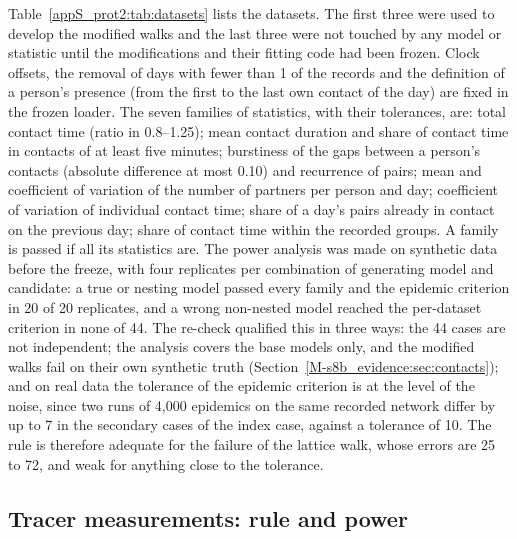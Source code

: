 Table~\ref{appS_prot2:tab:datasets} lists the datasets. The first three were used to develop the modified
walks and the last three were not touched by any model or statistic until the modifications and their fitting
code had been frozen. Clock offsets, the removal of days with fewer than 1\pct{} of the records and the
definition of a person's presence (from the first to the last own contact of the day) are fixed in the frozen
loader. The seven families of statistics, with their tolerances, are: total contact time (ratio in 0.8--1.25);
mean contact duration and share of contact time in contacts of at least five minutes; burstiness of the gaps
between a person's contacts (absolute difference at most 0.10) and recurrence of pairs; mean and coefficient
of variation of the number of partners per person and day; coefficient of variation of individual contact
time; share of a day's pairs already in contact on the previous day; share of contact time within the recorded
groups. A family is passed if all its statistics are.
The power analysis was made on synthetic data before the freeze, with four replicates per combination of
generating model and candidate: a true or nesting model passed every family and the epidemic criterion in 20
of 20 replicates, and a wrong non-nested model reached the per-dataset criterion in none of 44. The
re-check qualified this in three ways: the 44 cases are not independent; the analysis covers the
base models only, and the modified walks fail on their own synthetic truth
(Section~\ref{M-s8b_evidence:sec:contacts}); and on real data the tolerance of the epidemic criterion is at the
level of the noise, since two runs of 4{,}000 epidemics on the same recorded network differ by up to 7\pct{} in
the secondary cases of the index case, against a tolerance of 10\pct. The rule is therefore adequate for the
failure of the lattice walk, whose errors are 25 to 72\pct{}, and weak for anything close to the tolerance.

\subsection{Tracer measurements: rule and power}\label{appS_prot2:sec:tracer}

